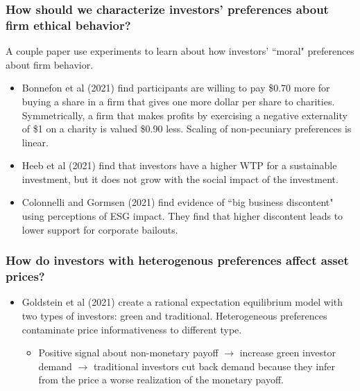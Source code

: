 \documentclass[handout]{beamer}
\begin{document}
\begin{frame}
\frametitle{How should we characterize investors' preferences about firm ethical behavior?}
A couple paper use experiments to learn about how investors' ``moral" preferences about firm behavior.
\bigskip
\begin{itemize}[<+->]
\item Bonnefon et al (2021) find participants are willing to pay \$0.70 more for buying a share in a firm that gives one more dollar per share to charities. Symmetrically, a firm that makes profits by exercising a negative externality of \$1 on a charity is valued \$0.90 less. Scaling of non-pecuniary preferences is linear.
\bigskip
\item Heeb et al (2021) find that investors have a higher WTP for a sustainable investment, but it does not grow with the social impact of the investment.
\bigskip
\item Colonnelli and Gormsen (2021) find evidence of ``big business discontent" using perceptions of ESG impact.  They find that higher discontent leads to lower support for corporate bailouts.
\end{itemize}
\end{frame}


\begin{frame}
\frametitle{How do investors with heterogenous preferences affect asset prices?}
\bigskip
\begin{itemize}[<+->]
\item Goldstein et al (2021) create a rational expectation equilibrium model with two types of investors: green and traditional. Heterogeneous preferences contaminate price informativeness to different type.  
\begin{itemize}
\item Positive signal about non-monetary payoff $\rightarrow$ increase green investor demand $\rightarrow$ traditional investors cut back demand because they infer from  the price a worse realization of the monetary payoff.
\end{itemize}
\end{itemize}
\end{frame}
\end{document}
